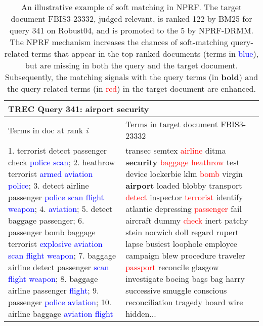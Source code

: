 \documentclass[11pt,a4paper]{article}
\begin{document}
\begin{table*}[tbh]
	\centering\small
	\begin{tabularx}{\textwidth}{|p{7.5cm}|X|}
		\hline
		\multicolumn{2}{|l|}{TREC Query 341: airport security}\\ \hline
		Terms in doc at rank {\em i} & Terms in target document FBIS3-23332 \\
		\hline
		1. terrorist detect passenger check \textcolor{blue}{police} \textcolor{blue}{scan};
2. heathrow  terrorist \textcolor{blue}{armed} \textcolor{blue}{aviation} \textcolor{blue}{police};
3. detect airline passenger \textcolor{blue}{police} \textcolor{blue}{scan} \textcolor{blue}{flight} \textcolor{blue}{weapon}; 4. \textcolor{blue}{aviation}; 5. detect baggage  passenger; 6. passenger bomb baggage  terrorist \textcolor{blue}{explosive} \textcolor{blue}{aviation} \textcolor{blue}{scan} \textcolor{blue}{flight} \textcolor{blue}{weapon}; 7. baggage airline detect passenger \textcolor{blue}{scan} \textcolor{blue}{flight}  \textcolor{blue}{weapon}; 8. baggage  airline passenger \textcolor{blue}{flight}; 9. passenger \textcolor{blue}{police} \textcolor{blue}{aviation}; 10. airline baggage \textcolor{blue}{aviation} \textcolor{blue}{flight}
		& transec semtex \textcolor{red}{airline} ditma {\bf security} \textcolor{red}{baggage} \textcolor{red}{heathrow} test device lockerbie klm \textcolor{red}{bomb} virgin {\bf airport} loaded blobby transport \textcolor{red}{detect} inspector \textcolor{red}{terrorist} identify atlantic depressing \textcolor{red}{passenger} fail aircraft dummy \textcolor{red}{check} inert patchy stein norwich doll regard rupert lapse busiest loophole employee campaign blew procedure traveler \textcolor{red}{passport} reconcile glasgow investigate boeing bags bag harry successive smuggle conscious reconciliation tragedy board wire hidden...\\
\hline
	\end{tabularx}
	\caption{\small An illustrative example of soft matching in NPRF. The target document FBIS3-23332, judged relevant, is ranked 122 by BM25 for query 341 on Robust04, and is promoted to the 5 by NPRF-DRMM. The NPRF mechanism increases the chances of soft-matching query-related terms that appear in the top-ranked documents (terms in \textcolor{blue}{blue}), but are missing in both the query and the target document. Subsequently, the matching signals with the query terms (in {\bf bold}) and the query-related terms (in \textcolor{red}{red}) in the target document are enhanced.
	}\label{tab.example}
\end{table*}
\end{document}
